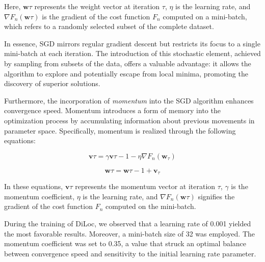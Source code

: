 \documentclass[a4paper, UKenglish, 11pt]{uiomaster}
\begin{document}
Here, $\textbf{w}{\tau}$ represents the weight vector at iteration $\tau$, $\eta$ is the learning rate, and $\nabla F_n(\textbf{w}{\tau})$ is the gradient of the cost function $F_n$ computed on a mini-batch, which refers to a randomly selected subset of the complete dataset.

In essence, SGD mirrors regular gradient descent but restricts its focus to a single mini-batch at each iteration. The introduction of this stochastic element, achieved by sampling from subsets of the data, offers a valuable advantage: it allows the algorithm to explore and potentially escape from local minima, promoting the discovery of superior solutions.

Furthermore, the incorporation of \emph{momentum} into the SGD algorithm enhances convergence speed. Momentum introduces a form of memory into the optimization process by accumulating information about previous movements in parameter space. Specifically, momentum is realized through the following equations:

\begin{equation}
\textbf{v}{\tau} = \gamma\textbf{v}{\tau-1} - \eta\nabla F_n(\textbf{w}_{\tau})
\end{equation}

\begin{equation}
\textbf{w}{\tau} = \textbf{w}{\tau-1} + \textbf{v}_{\tau}
\end{equation}

In these equations, $\textbf{v}{\tau}$ represents the momentum vector at iteration $\tau$, $\gamma$ is the momentum coefficient, $\eta$ is the learning rate, and $\nabla F_n(\textbf{w}{\tau})$ signifies the gradient of the cost function $F_n$ computed on the mini-batch.

During the training of DiLoc, we observed that a learning rate of 0.001 yielded the most favorable results. Moreover, a mini-batch size of 32 was employed. The momentum coefficient was set to 0.35, a value that struck an optimal balance between convergence speed and sensitivity to the initial learning rate parameter.
\end{document}
